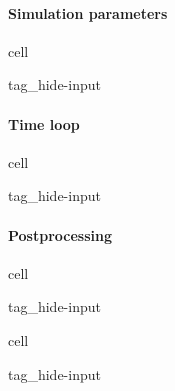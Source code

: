 \documentclass[letterpaper,10pt,english]{jupyterBook}
\begin{document}
\paragraph{Simulation parameters}
\label{\detokenize{ch/pde/euler-1d:simulation-parameters}}
\begin{sphinxuseclass}{cell}
\begin{sphinxuseclass}{tag_hide-input}
\end{sphinxuseclass}
\end{sphinxuseclass}

\paragraph{Time loop}
\label{\detokenize{ch/pde/euler-1d:time-loop}}
\begin{sphinxuseclass}{cell}
\begin{sphinxuseclass}{tag_hide-input}
\end{sphinxuseclass}
\end{sphinxuseclass}

\paragraph{Post\sphinxhyphen{}processing}
\label{\detokenize{ch/pde/euler-1d:post-processing}}
\begin{sphinxuseclass}{cell}
\begin{sphinxuseclass}{tag_hide-input}
\end{sphinxuseclass}
\end{sphinxuseclass}
\begin{sphinxuseclass}{cell}
\begin{sphinxuseclass}{tag_hide-input}
\end{sphinxuseclass}
\end{sphinxuseclass}
\sphinxstepscope
\end{document}
